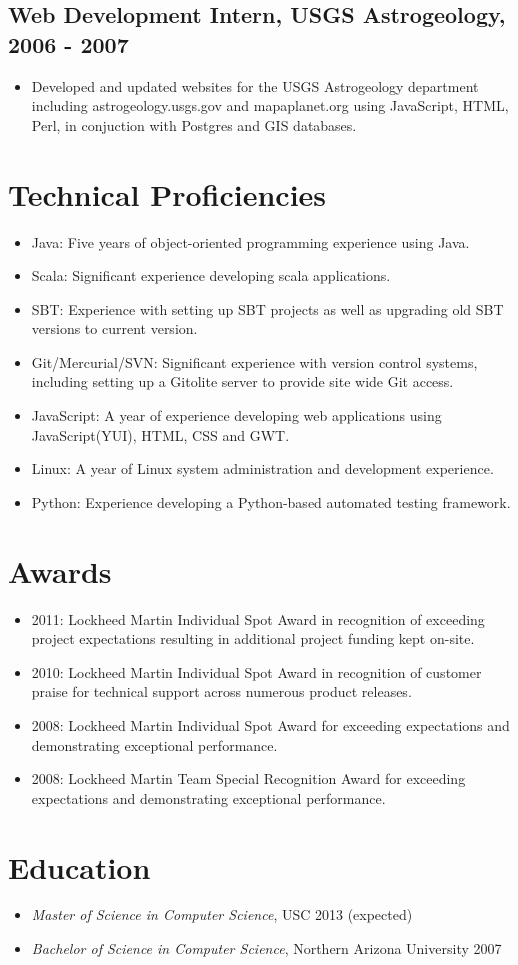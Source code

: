 \documentclass[11pt]{article}
\begin{document}
\subsection*{Web Development Intern, USGS Astrogeology, 2006 - 2007}
\label{sec-1.2}

\begin{itemize}
\item Developed and updated websites for the USGS Astrogeology department including astrogeology.usgs.gov and mapaplanet.org using JavaScript, HTML, Perl, in conjuction with Postgres and GIS databases.
\end{itemize}
\section*{Technical Proficiencies}
\label{sec-2}

\begin{itemize}
\item Java: Five years of object-oriented programming experience using Java.
\item Scala: Significant experience developing scala applications.
\item SBT: Experience with setting up SBT projects as well as upgrading old SBT versions to current version.
\item Git/Mercurial/SVN: Significant experience with version control systems, including setting up a Gitolite server to provide site wide Git access.
\item JavaScript: A year of experience developing web applications using JavaScript(YUI), HTML, CSS and GWT.
\item Linux: A year of Linux system administration and development experience.
\item Python: Experience developing a Python-based automated testing framework.
\end{itemize}
\section*{Awards}
\label{sec-3}

\begin{itemize}
\item 2011: Lockheed Martin Individual Spot Award in recognition of exceeding project expectations resulting in additional project funding kept on-site.
\item 2010: Lockheed Martin Individual Spot Award in recognition of customer praise for technical support across numerous product releases.
\item 2008: Lockheed Martin Individual Spot Award for exceeding expectations and demonstrating exceptional performance.
\item 2008: Lockheed Martin Team Special Recognition Award for exceeding expectations and demonstrating exceptional performance.
\end{itemize}
\section*{Education}
\label{sec-4}

\begin{itemize}
\item \emph{Master of Science in Computer Science}, USC 2013 (expected)
\item \emph{Bachelor of Science in Computer Science}, Northern Arizona University 2007
\end{itemize}
\end{document}
